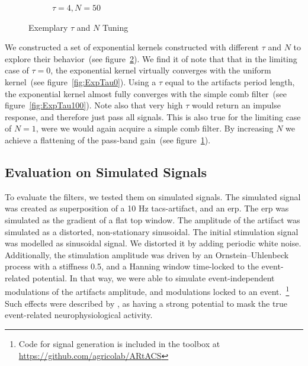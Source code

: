 \documentclass[a4paper]{article}
\newcommand{\figref}[1]{(see figure~\ref{#1})}
\begin{document}
\begin{figure}[hbtp]
\begin{subfigure}{.245\textwidth}
        \caption{$\tau= 4, N=50$}\label{fig:ExpNP50}
    \end{subfigure}
    \caption{Exemplary $\tau$ and $N$ Tuning}\label{fig:ExemplaryTuning}
\end{figure}

We constructed a set of exponential kernels constructed with different $\tau$ and $N$ to explore their behavior~\figref{fig:ExemplaryTuning}.
We find it of note that that in the limiting case of $\tau = 0$, the exponential kernel virtually converges with the uniform kernel~\figref{fig:ExpTau0}. Using a $\tau$ equal to the artifacts period length, the exponential kernel almost fully converges with the simple comb filter~\figref{fig:ExpTau100}.
Note also that very high $\tau$ would return an impulse response, and therefore just pass all signals.
This is also  true for the limiting case of $N = 1$, were we would again acquire a simple comb filter. By increasing $N$ we achieve a flattening of the pass-band gain~\figref{fig:ExpNP50}.

\subsection{Evaluation on Simulated Signals}\label{sec:EvaluationSimulated}

To evaluate the filters, we tested them on simulated signals. The simulated signal was created as superposition of a 10 Hz \gls{tacs}-artifact, and an \gls{erp}.
The \gls{erp} was simulated as the gradient of a flat top window. The amplitude of the artifact was simulated as a distorted, non-stationary sinusoidal.
The initial stimulation signal was modelled as sinusoidal signal. We distorted it by adding periodic white noise. Additionally, the stimulation amplitude was driven by an Ornstein–Uhlenbeck process with a stiffness 0.5, and a Hanning window time-locked to the event- related potential.
In that way, we were able to simulate event-independent modulations of the artifacts amplitude, and modulations locked to an event.~\footnote{Code for signal generation is included in the toolbox at \url{https://github.com/agricolab/ARtACS}}
Such effects were described by \citep{Noury_2016}, as having a strong potential to mask the true event-related neurophysiological activity.
\end{document}
